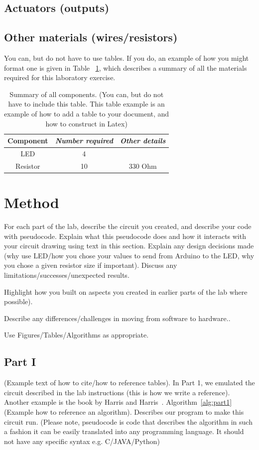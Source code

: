 \documentclass[journal]{IEEEtran}
\begin{document}
\subsection{Actuators (outputs)}
\subsection{Other materials (wires/resistors)}

You can, but do not have to use tables. If you do, an example of how you might format one is given in Table ~\ref{tab1}, which describes a summary of all the materials required for this laboratory exercise.

\newpage
\begin{table}[htbp]
\caption{Summary of all components. (You can, but do not have to include this table. This table example is an example of how to add a table to  your document, and how to construct in Latex)}
\begin{center}
\begin{tabular}{|c|c|c|}
\hline
\textbf{Component} & \textbf{\textit{Number required}}& \textbf{\textit{Other details}}\\
\hline
LED& 4 &  \\
Resistor& 10 &  330 Ohm\\
\hline
\end{tabular}
\label{tab1}
\end{center}
\end{table}

\section{Method}
For each part of the lab, describe the circuit you created, and describe your code with pseudocode. Explain what this pseudocode does and how it interacts with your circuit drawing using text in this section. Explain any design decisions made (why use LED/how you chose your values to send from Arduino to the LED, why you chose a given resistor size if important). Discuss any limitations/successes/unexpected results.

Highlight how you built on aspects you created in earlier parts of the lab where possible).

Describe any differences/challenges in moving from software to hardware..

Use Figures/Tables/Algorithms as appropriate.

\subsection{Part I}
(Example text of how to cite/how to reference tables). In Part 1, we emulated the circuit described in the lab instructions \cite{elec1601_notes} (this is how we write a reference). Another example is the book by Harris and Harris~\cite{harris2010digital}. Algorithm~\ref{alg:part1} (Example how to reference an algorithm). Describes our program to make this circuit run. (Please note, pseudocode is code that describes the algorithm in such a fashion it can be easily translated into any programming language. It should not have any specific syntax e.g. C/JAVA/Python)
\end{document}
